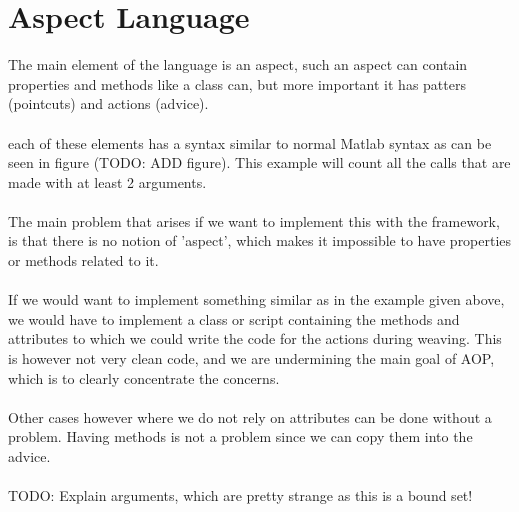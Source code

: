 \documentclass[a4paper]{report}
\begin{document}
\section{Aspect Language}
The main element of the language is an aspect, such an aspect can contain properties and methods like a class can, but more important it has patters (pointcuts) and actions (advice).\\
\\
each of these elements has a syntax similar to normal Matlab syntax as can be seen in figure (TODO: ADD figure). This example will count all the calls that are made with at least 2 arguments.\\
\\
The main problem that arises if we want to implement this with the framework, is that there is no notion of 'aspect', which makes it impossible to have properties or methods related to it.\\
\\
If we would want to implement something similar as in the example given above, we would have to implement a class or script containing the methods and attributes to which we could write the code for the actions during weaving. This is however not very clean code, and we are undermining the main goal of AOP, which is to clearly concentrate the concerns.\\
\\
Other cases however where we do not rely on attributes can be done without a problem. Having methods is not a problem since we can copy them into the advice.\\
\\
TODO: Explain arguments, which are pretty strange as this is a bound set!
\end{document}

